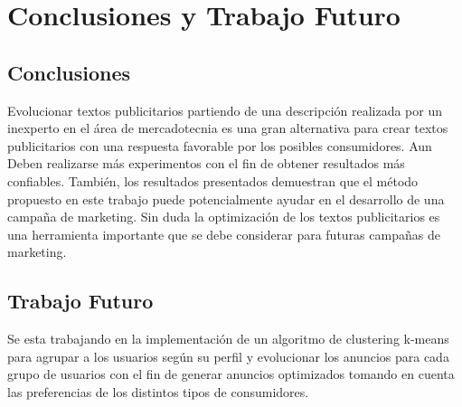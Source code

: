 
\chapter{Conclusiones y Trabajo Futuro}


\section{Conclusiones}

Evolucionar textos publicitarios partiendo de una descripción realizada por un inexperto en el área de mercadotecnia es una gran alternativa para crear textos publicitarios con una respuesta favorable por los posibles consumidores. Aun Deben realizarse más experimentos con el fin de obtener resultados más confiables. También, los resultados presentados demuestran que el método propuesto en este trabajo puede potencialmente ayudar en el desarrollo de una campaña de marketing.
Sin duda la optimización de los textos publicitarios es una herramienta importante que se debe considerar para futuras campañas de marketing.


\section{Trabajo Futuro}

Se esta trabajando en la implementación de un algoritmo de clustering k-means para agrupar a los usuarios según su perfil y evolucionar los anuncios para cada grupo de usuarios con el fin de generar anuncios optimizados tomando en cuenta las preferencias de los distintos tipos de consumidores.